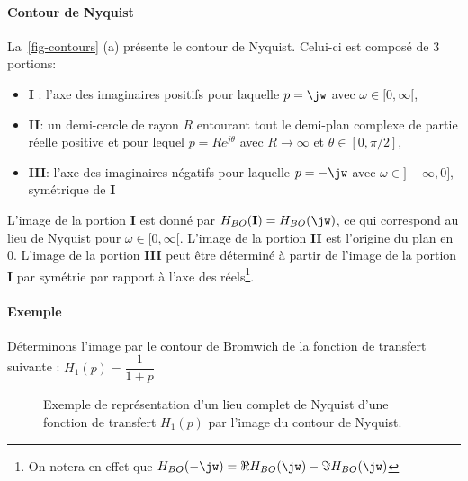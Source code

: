 \paragraph{Contour de Nyquist}
La~\cref{fig-contours} (a) présente le contour de Nyquist. Celui-ci est 
composé de 3 portions:
\begin{itemize}
    \item \textbf{I} : l'axe des imaginaires positifs pour laquelle $p=\jw$ 
          avec $\omega\in[0,\infty[$,
    \item \textbf{II}: un demi-cercle de rayon $R$ entourant tout le 
          demi-plan complexe de partie réelle positive et pour lequel 
          $p=Re^{j\theta}$ avec $R\rightarrow\infty$ et $\theta\in[0,\pi/2]$,
    \item \textbf{III}: l'axe des imaginaires négatifs  pour laquelle $p=-\jw$ 
          avec $\omega\in]-\infty,0]$, symétrique de \textbf{I}
\end{itemize}
L'image de la portion \textbf{I} est donné par 
$H_{BO}(\boldsymbol{\mathrm{I}})=H_{BO}(\jw)$, ce qui correspond au lieu de 
Nyquist pour $\omega\in[0,\infty[$. L'image de la portion \textbf{II} est 
l'origine du plan en 0. L'image de la portion \textbf{III} peut être 
déterminé à partir de l'image de la portion \textbf{I} par symétrie par 
rapport à l'axe des réels\footnote{On notera en effet que 
$H_{BO}(-\jw)=\Re{H_{BO}(\jw)}-\Im{H_{BO}(\jw)}$}.
\paragraph{Exemple}
Déterminons l'image par le contour de Bromwich de la fonction de transfert 
suivante : $H_1(p)=\dfrac{1}{1+p}$
\begin{figure}[!h]
    \centering
    
    \caption{Exemple de représentation d'un lieu complet de Nyquist d'une 
             fonction de transfert $H_1(p)$ par l'image du contour de 
             Nyquist. \label{fig-nyquist_complet_contour}}
\end{figure}
